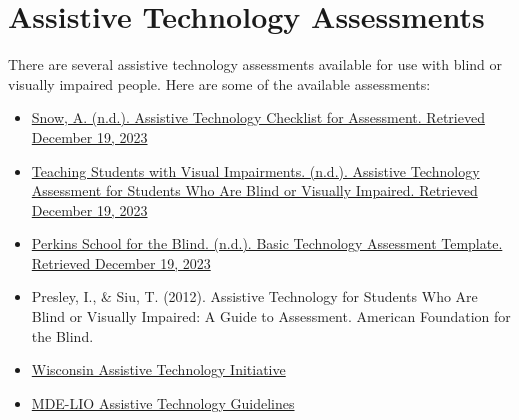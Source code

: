\pagebreak \hypertarget{trouble4}{}\section[Assistive Technology Assessments]{Assistive Technology Assessments}\label{trouble4}
There are several assistive technology assessments available for use with blind or visually impaired people. Here are some of the available assessments:
\begin{itemize}[leftmargin=*]
	\item \href{https://www.teachingvisuallyimpaired.com/assistive-technology-assessment.html}{Snow, A. (n.d.). Assistive Technology Checklist for Assessment. Retrieved December 19, 2023} 
	\item \href{http://www.teachingvisuallyimpaired.com/uploads/1/4/1/2/14122361/at\_assessment\_revised.pdf}{Teaching Students with Visual Impairments. (n.d.). Assistive Technology Assessment for Students Who Are Blind or Visually Impaired. Retrieved December 19, 2023}
	\item \href{https://www.perkins.org/sites/elearning.perkinsdev1.org/files/Basic\%20Technology\%20Assessment\%20Template\_0\_0.docx}{Perkins School for the Blind. (n.d.). Basic Technology Assessment Template. Retrieved December 19, 2023}
	\item Presley, I., \& Siu, T. (2012). Assistive Technology for Students Who Are Blind or Visually Impaired: A Guide to Assessment. American Foundation for the Blind.
	\item \href{https://www.wati.org/free-publications/assessing-students-needs-for-assistive-technology/}{Wisconsin Assistive Technology Initiative}
	\item \href{https://mdelio.org/blind-visually-impaired/educator-support/assistive-technology-guidelines}{MDE-LIO Assistive Technology Guidelines}
	      
	      
\end{itemize}